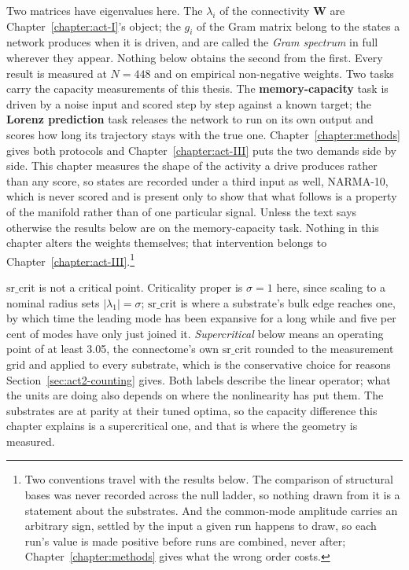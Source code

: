 Two matrices have eigenvalues here. The $\lambda_i$ of the connectivity
$\mathbf{W}$ are Chapter~\ref{chapter:act-I}'s object; the $g_i$ of the Gram
matrix belong to the states a network produces when it is driven, and are called
the \emph{Gram spectrum} in full wherever they appear. Nothing below obtains the
second from the first. Every result is measured at
$N = 448$ %
and on empirical non-negative weights. Two tasks carry the capacity measurements
of this thesis. The \textbf{memory-capacity} task is driven by a
noise input %
and scored step by step against a known target; the \textbf{Lorenz prediction} task
releases the network to run on its own output and scores how long its trajectory
stays with the true one. Chapter~\ref{chapter:methods} gives both protocols and
Chapter~\ref{chapter:act-III} puts the two demands side by side. This chapter
measures the shape of the activity a drive produces rather than any score, so
states are recorded under a third input as well, NARMA-10, which is never scored
and is present only to show that what follows is a property of the manifold
rather than of one particular signal. Unless the text says otherwise the results
below are on the memory-capacity task. Nothing in this chapter alters the
weights themselves; that intervention belongs to
Chapter~\ref{chapter:act-III}.\footnote{Two conventions travel with the results
below. The comparison of structural bases was never recorded across the null
ladder, so nothing drawn from it is a statement about the
substrates. %
And the common-mode amplitude carries an arbitrary sign, settled by the input a
given run happens to draw, so each run's value is made positive before runs are
combined, never after; Chapter~\ref{chapter:methods} gives what the wrong order
costs.}

$\mathrm{sr\_crit}$ is not a critical point. Criticality proper is $\sigma = 1$
here, since scaling to a nominal radius sets $|\lambda_1| = \sigma$;
$\mathrm{sr\_crit}$ is where a substrate's bulk edge reaches one, by which time
the leading mode has been expansive for a long while and
five per cent %
of modes have only just joined it. \emph{Supercritical} below means an operating
point of at least 3.05, %
the connectome's own $\mathrm{sr\_crit}$ rounded to the measurement grid and
applied to every substrate, which is the conservative choice for reasons
Section~\ref{sec:act2-counting} gives. Both labels describe the linear operator;
what the units are doing also depends on where the nonlinearity has put them.
The substrates are at parity at their tuned optima, so the capacity difference
this chapter explains is a supercritical one, and that is where the geometry is
measured.

